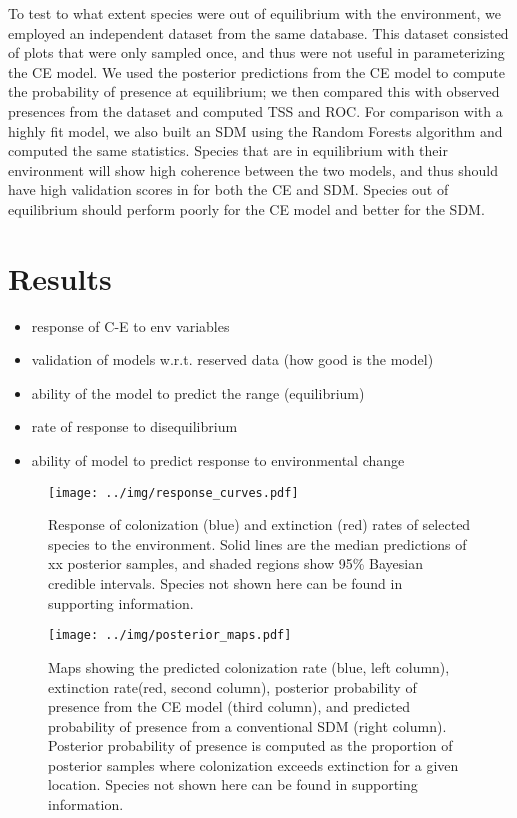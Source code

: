 \documentclass[11pt]{article}
\begin{document}
To test to what extent species were out of equilibrium with the environment, we employed an independent dataset from the same database.
This dataset consisted of plots that were only sampled once, and thus were not useful in parameterizing the CE model.
We used the posterior predictions from the CE model to compute the probability of presence at equilibrium; we then compared this with observed presences from the dataset and computed TSS and ROC.
For comparison with a highly fit model, we also built an SDM using the Random Forests algorithm and computed the same statistics.
Species that are in equilibrium with their environment will show high coherence between the two models, and thus should have high validation scores in for both the CE and SDM.
Species out of equilibrium should perform poorly for the CE model and better for the SDM.


\section*{Results}
\begin{itemize}
	\item response of C-E to env variables
	\item validation of models w.r.t. reserved data (how good is the model)
	\item ability of the model to predict the range (equilibrium)
	\item rate of response to disequilibrium
	\item ability of model to predict response to environmental change
\end{itemize}
\begin{figure}
	\texttt{[image: ../img/response\_curves.pdf]}
	\caption{
		Response of colonization (blue) and extinction (red) rates of selected species to the environment.
		Solid lines are the median predictions of xx posterior samples, and shaded regions show 95\% Bayesian credible intervals.
		Species not shown here can be found in supporting information.
	}
	\label{fig:response_curves}
\end{figure}


\begin{figure}
	\texttt{[image: ../img/posterior\_maps.pdf]}
	\caption{
		Maps showing the predicted colonization rate (blue, left column), extinction rate(red, second column), posterior probability of presence from the CE model (third column), and predicted probability of presence from a conventional SDM (right column).
		Posterior probability of presence is computed as the proportion of posterior samples where colonization exceeds extinction for a given location.
		Species not shown here can be found in supporting information.
	}
	\label{fig:response_curves}
\end{figure}
\end{document}
